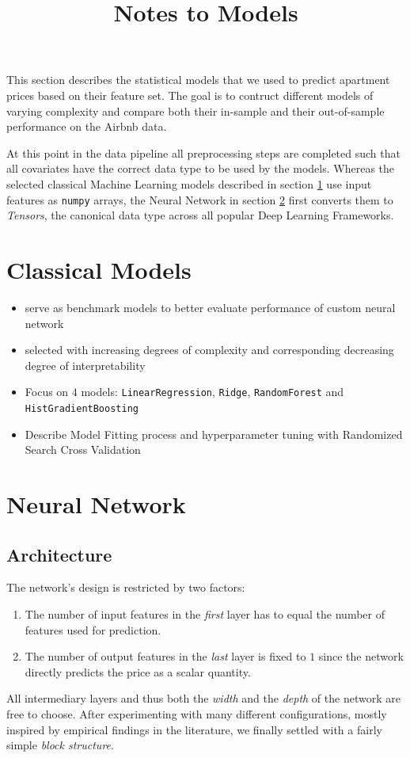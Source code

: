 \documentclass[12pt, letterpaper]{article}
\title{Notes to Models}
\author{}
\date{}
\begin{document}
\maketitle

This section describes the statistical models that we used to predict apartment prices based on their feature set.
The goal is to contruct different models of varying complexity and compare both their in-sample and their out-of-sample performance on the Airbnb data.

At this point in the data pipeline all preprocessing steps are completed such that all covariates have the correct data type to be used by the models.
Whereas the selected classical Machine Learning models described in section \ref{classical-models} use input features as \texttt{numpy} arrays, the Neural Network in section \ref{neural-network} first converts them to \emph{Tensors}, the canonical data type across all popular Deep Learning Frameworks.

\section{Classical Models} \label{classical-models}

\begin{itemize}
    \item serve as benchmark models to better evaluate performance of custom neural network
    \item selected with increasing degrees of complexity and corresponding decreasing degree of interpretability
    \item Focus on $4$ models: \texttt{LinearRegression}, \texttt{Ridge}, \texttt{RandomForest} and \texttt{HistGradientBoosting}
    \item Describe Model Fitting process and hyperparameter tuning with Randomized Search Cross Validation
\end{itemize}



\section{Neural Network} \label{neural-network}

\subsection{Architecture}

The network's design is restricted by two factors:
\begin{enumerate}
    \item The number of input features in the \emph{first} layer has to equal the number of features used for prediction.
    \item The number of output features in the \emph{last} layer is fixed to $1$ since the network directly predicts the price as a scalar quantity.
\end{enumerate}
All intermediary layers and thus both the \emph{width} and the \emph{depth} of the network are free to choose.
After experimenting with many different configurations, mostly inspired by empirical findings in the literature, we finally settled with a fairly simple \emph{block structure}.
\end{document}

